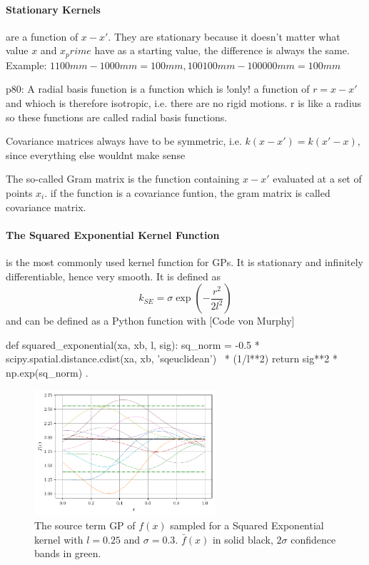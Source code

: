\documentclass[%
  a4paper,oneside,%
  11pt,%
  smallchapters,
  green,%
  rgb, <cmyk>
  ]{tubsbook}
\begin{document}
\paragraph{Stationary Kernels} are a function of $x-x'$. They are stationary because it doesn't matter what value $x$ and $x_prime$ have as a starting value, the difference is always the same. Example: $1100mm -1000mm = 100 mm, 100100mm-100000mm = 100mm$


p80: A radial basis function is a function which is !only! a function of $r=x-x'$ and whioch is therefore isotropic, i.e. there are no rigid motions. r is like a radius so these functions are called radial basis functions.

Covariance matrices always have to be symmetric, i.e. $k(x-x') = k(x'-x)$, since everything else wouldnt make sense

The so-called Gram matrix is the function containing $x-x'$ evaluated at a set of points $x_i$. if the function is a covariance funtion, the gram matrix is called covariance matrix.
\paragraph{The Squared Exponential Kernel Function} is the most commonly used kernel function for GPs. It is stationary and infinitely differentiable, hence very smooth. 
It is defined as
\begin{equation}
k_{SE} = \sigma \exp(-\frac{r^2}{2l^2})
\end{equation}
%
and can be defined as a Python function with
[Code von Murphy] 
\begin{python}
def squared_exponential(xa, xb, l, sig):
    sq_norm = -0.5 * scipy.spatial.distance.cdist(xa, xb, 'sqeuclidean') \
    	* (1/l**2)
    return sig**2 * np.exp(sq_norm) .
\end{python}
\label{lst:sqEx}


\begin{figure}[h]
\begin{center}

\includegraphics[width=0.6\textwidth]{pics/sqexp_f_sampled}
\caption{The source term GP of $f(x)$ sampled for a Squared Exponential kernel with $l = 0.25$ and $\sigma = 0.3$. $\bar{f}(x)$ in solid black, $2\sigma$ confidence bands in green.}
\label{fig:Matern1_2}

\end{center}
\end{figure}
\end{document}
